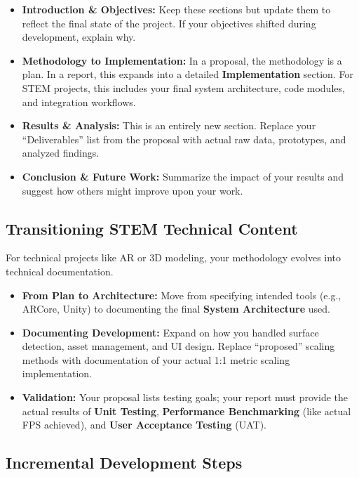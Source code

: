 \documentclass{report}
\begin{document}
\begin{itemize}
  \item \textbf{Introduction \& Objectives:} Keep these sections but update them
    to reflect the final state of the project. If your objectives shifted during
    development, explain why.
  \item \textbf{Methodology to Implementation:} In a proposal, the methodology is
    a plan. In a report, this expands into a detailed \textbf{Implementation}
    section. For STEM projects, this includes your final system architecture,
    code modules, and integration workflows.
  \item \textbf{Results \& Analysis:} This is an entirely new section. Replace
    your ``Deliverables'' list from the proposal with actual raw data,
    prototypes, and analyzed findings.
  \item \textbf{Conclusion \& Future Work:} Summarize the impact of your results
    and suggest how others might improve upon your work.
\end{itemize}

\subsection{Transitioning STEM Technical Content}

For technical projects like AR or 3D modeling, your methodology evolves into
technical documentation.

\begin{itemize}
  \item \textbf{From Plan to Architecture:} Move from specifying intended tools
    (e.g., ARCore, Unity) to documenting the final \textbf{System Architecture}
    used.
  \item \textbf{Documenting Development:} Expand on how you handled surface
    detection, asset management, and UI design. Replace ``proposed'' scaling
    methods with documentation of your actual 1:1 metric scaling implementation.
  \item \textbf{Validation:} Your proposal lists testing goals; your report must
    provide the actual results of \textbf{Unit Testing}, \textbf{Performance
    Benchmarking} (like actual FPS achieved), and \textbf{User Acceptance
    Testing} (UAT).
\end{itemize}

\subsection{Incremental Development Steps}
\end{document}
